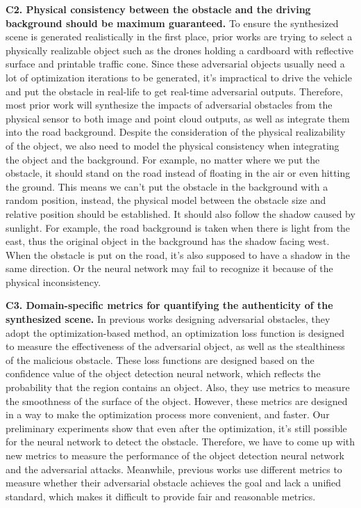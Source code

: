\textbf{C2. Physical consistency between the obstacle and the driving background should be maximum guaranteed.} 
To ensure the synthesized scene is generated realistically in the first place, 
prior works are trying to select a physically realizable object such as the drones holding a cardboard with reflective surface\cite{25} and printable traffic cone\cite{msf-adv}.
Since these adversarial objects usually need a lot of optimization iterations to be generated, 
it's impractical to drive the vehicle and put the obstacle in real-life to get real-time adversarial outputs.
Therefore, most prior work will synthesize the impacts of adversarial obstacles from the physical sensor to both image and point cloud outputs, as well as integrate them into the road background.
Despite the consideration of the physical realizability of the object, we also need to model the physical consistency when integrating the object and the background.
For example, no matter where we put the obstacle, it should stand on the road instead of floating in the air or even hitting the ground. 
This means we can't put the obstacle in the background with a random position, instead, the physical model between the obstacle size and relative position should be established.
It should also follow the shadow caused by sunlight. 
For example, the road background is taken when there is light from the east, thus the original object in the background has the shadow facing west.
When the obstacle is put on the road, it's also supposed to have a shadow in the same direction.
Or the neural network may fail to recognize it because of the physical inconsistency.

\textbf{C3. Domain-specific metrics for quantifying the authenticity of the synthesized scene. }
In previous works designing adversarial obstacles, they adopt the optimization-based method,
an optimization loss function is designed to measure the effectiveness of the adversarial object, as well as the stealthiness of the malicious obstacle.
These loss functions are designed based on the confidence value of the object detection neural network, which reflects the probability that the region contains an object\cite{msf-adv}. 
Also, they use metrics to measure the smoothness of the surface of the object.
However, these metrics are designed in a way to make the optimization process more convenient, and faster.
Our preliminary experiments show that even after the optimization, it's still possible for the neural network to detect the obstacle.
Therefore, we have to come up with new metrics to measure the performance of the object detection neural network and the adversarial attacks.
Meanwhile, previous works use different metrics to measure whether their adversarial obstacle achieves the goal and lack a unified standard, 
which makes it difficult to provide fair and reasonable metrics. 

